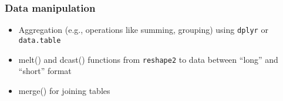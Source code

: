 \documentclass[
	11pt, %
]{beamer}
\begin{document}
\begin{frame}
	\frametitle{Data manipulation}
	
	\begin{itemize}
			\item Aggregation (e.g., operations like summing, grouping) using \texttt{dplyr} or \texttt{data.table}
			\item melt() and dcast() functions from \texttt{reshape2} to \href{https://seananderson.ca/2013/10/19/reshape/}{\color{blue}{transform}} data between ``long” and ``short” format
			\item merge() for joining tables
	\end{itemize}
\end{frame}
\end{document}
